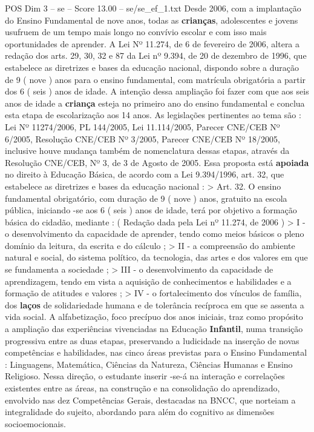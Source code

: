 \begin{textsample}{POS Dim 3 – se – Score 13.00 – se/se\_ef\_1.txt}
Desde 2006, com a implantação do Ensino Fundamental de nove anos, todas as \textbf{crianças}, adolescentes e jovens usufruem de um tempo mais longo no convívio escolar e com isso mais oportunidades de aprender.
A Lei Nº 11.274, de 6 de fevereiro de 2006, altera a redação dos arts. 29, 30, 32 e 87 da Lei nº 9.394, de 20 de dezembro de 1996, que estabelece as diretrizes e bases da educação nacional, dispondo sobre a duração de 9 ( nove ) anos para o ensino fundamental, com matrícula obrigatória a partir dos 6 ( seis ) anos de idade.
A intenção dessa ampliação foi fazer com que aos seis anos de idade a \textbf{criança} esteja no primeiro ano do ensino fundamental e conclua esta etapa de escolarização aos 14 anos.
As legislações pertinentes ao tema são : Lei Nº 11274/2006, PL 144/2005, Lei 11.114/2005, Parecer CNE/CEB Nº 6/2005, Resolução CNE/CEB Nº 3/2005, Parecer CNE/CEB Nº 18/2005, inclusive houve mudança também de nomenclatura dessas etapas, através da Resolução CNE/CEB, Nº 3, de 3 de Agosto de 2005.
Essa proposta está \textbf{apoiada} no direito à Educação Básica, de acordo com a Lei 9.394/1996, art. 32, que estabelece as diretrizes e bases da educação nacional : > Art. 32.
O ensino fundamental obrigatório, com duração de 9 ( nove ) anos, gratuito na escola pública, iniciando -se aos 6 ( seis ) anos de idade, terá por objetivo a formação básica do cidadão, mediante : ( Redação dada pela Lei nº 11.274, de 2006 ) > I - o desenvolvimento da capacidade de aprender, tendo como meios básicos o pleno domínio da leitura, da escrita e do cálculo ; > II - a compreensão do ambiente natural e social, do sistema político, da tecnologia, das artes e dos valores em que se fundamenta a sociedade ; > III - o desenvolvimento da capacidade de aprendizagem, tendo em vista a aquisição de conhecimentos e habilidades e a formação de atitudes e valores ; > IV - o fortalecimento dos vínculos de família, dos \textbf{laços} de solidariedade humana e de tolerância recíproca em que se assenta a vida social.
A alfabetização, foco precípuo dos anos iniciais, traz como propósito a ampliação das experiências vivenciadas na Educação \textbf{Infantil}, numa transição progressiva entre as duas etapas, preservando a ludicidade na inserção de novas competências e habilidades, nas cinco áreas previstas para o Ensino Fundamental : Linguagens, Matemática, Ciências da Natureza, Ciências Humanas e Ensino Religioso.
Nessa direção, o estudante inserir -se-á na interação e correlações existentes entre as áreas, na construção e na consolidação do aprendizado, envolvido nas dez Competências Gerais, destacadas na BNCC, que norteiam a integralidade do sujeito, abordando para além do cognitivo as dimensões socioemocionais.

\end{textsample}
